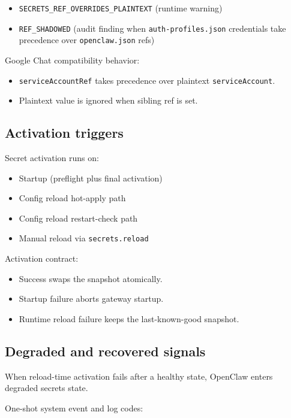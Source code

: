 \begin{itemize}
  \item \texttt{SECRETS\_REF\_OVERRIDES\_PLAINTEXT} (runtime warning)
  \item \texttt{REF\_SHADOWED} (audit finding when \texttt{auth-profiles.json} credentials take precedence over \texttt{openclaw.json} refs)
\end{itemize}


Google Chat compatibility behavior:

\begin{itemize}
  \item \texttt{serviceAccountRef} takes precedence over plaintext \texttt{serviceAccount}.
  \item Plaintext value is ignored when sibling ref is set.
\end{itemize}


\subsection{Activation triggers}


Secret activation runs on:

\begin{itemize}
  \item Startup (preflight plus final activation)
  \item Config reload hot-apply path
  \item Config reload restart-check path
  \item Manual reload via \texttt{secrets.reload}
\end{itemize}


Activation contract:

\begin{itemize}
  \item Success swaps the snapshot atomically.
  \item Startup failure aborts gateway startup.
  \item Runtime reload failure keeps the last-known-good snapshot.
\end{itemize}


\subsection{Degraded and recovered signals}


When reload-time activation fails after a healthy state, OpenClaw enters degraded secrets state.

One-shot system event and log codes:


